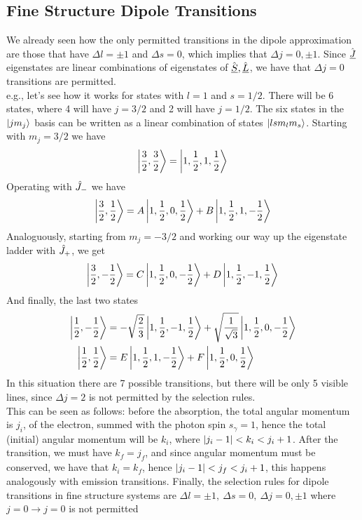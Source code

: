\documentclass[../qm.tex]{subfiles}
\begin{document}
	\subsection{Fine Structure Dipole Transitions}
	We already seen how the only permitted transitions in the dipole approximation are those that have $\Delta l=\pm1$ and $\Delta s=0$, which implies that $\Delta j=0,\pm1$. Since $\hat{\underline{J}}$ eigenstates are linear combinations of eigenstates of $\hat{\underline{S}},\hat{\underline{L}}$, we have that $\Delta j=0$ transitions are permitted.\\
	e.g., let's see how it works for states with $l=1$ and $s=1/2$. There will be 6 states, where 4 will have $j=3/2$ and 2 will have $j=1/2$. The six states in the $\ket{jm_j}$ basis can be written as a linear combination of states $\ket{lsm_lm_s}$. Starting with $m_j=3/2$ we have
	\begin{equation*}
		\ket{\frac{3}{2},\frac{3}{2}}=\ket{1,\frac{1}{2},1,\frac{1}{2}}
	\end{equation*}
	Operating with $\hat{J}_{-}$ we have
	\begin{equation*}
		\ket{\frac{3}{2},\frac{1}{2}}=A\ket{1,\frac{1}{2},0,\frac{1}{2}}+B\ket{1,\frac{1}{2},1,-\frac{1}{2}}
	\end{equation*}
	Analoguously, starting from $m_j=-3/2$ and working our way up the eigenstate ladder with $\hat{J}_{+}$, we get
	\begin{equation*}
		\ket{\frac{3}{2},-\frac{1}{2}}=C\ket{1,\frac{1}{2},0,-\frac{1}{2}}+D\ket{1,\frac{1}{2},-1,\frac{1}{2}}
	\end{equation*}
	And finally, the last two states
	\begin{equation*}
		\begin{aligned}
			\ket{\frac{1}{2},-\frac{1}{2}}&=-\sqrt{\frac{2}{3}}\ket{1,\frac{1}{2},-1,\frac{1}{2}}+\sqrt{\frac{1}{\sqrt{3}}}\ket{1,\frac{1}{2},0,-\frac{1}{2}}\\
			\ket{\frac{1}{2},\frac{1}{2}}&=E\ket{1,\frac{1}{2},1,-\frac{1}{2}}+F\ket{1,\frac{1}{2},0,\frac{1}{2}}
		\end{aligned}
	\end{equation*}
	In this situation there are 7 possible transitions, but there will be only 5 visible lines, since $\Delta j=2$ is not permitted by the selection rules.\\
	This can be seen as follows: before the absorption, the total angular momentum is $j_i$, of the electron, summed with the photon spin $s_{\gamma}=1$, hence the total (initial) angular momentum will be $k_i$, where $\abs{j_i-1}<k_i<j_i+1$. After the transition, we must have $k_f=j_f$, and since angular momentum must be conserved, we have that $k_i=k_f$, hence $\abs{j_i-1}<j_f<j_i+1$, this happens analogously with emission transitions.
	Finally, the selection rules for dipole transitions in fine structure systems are $\Delta l=\pm1,\ \Delta s=0,\ \Delta j=0,\pm1$ where $j=0\to j=0$ is not permitted
\end{document}
